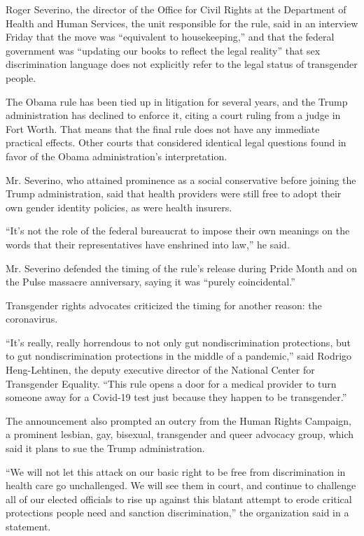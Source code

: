Roger Severino, the director of the Office for Civil Rights at the
Department of Health and Human Services, the unit responsible for the
rule, said in an interview Friday that the move was ``equivalent to
housekeeping,'' and that the federal government was ``updating our books
to reflect the legal reality'' that sex discrimination language does not
explicitly refer to the legal status of transgender people.

The Obama rule has been tied up in litigation for several years, and the
Trump administration has declined to enforce it, citing a court ruling
from a judge in Fort Worth. That means that the final rule does not have
any immediate practical effects. Other courts that considered identical
legal questions found in favor of the Obama administration's
interpretation.

Mr. Severino, who attained prominence as a social conservative before
joining the Trump administration, said that health providers were still
free to adopt their own gender identity policies, as were health
insurers.

``It's not the role of the federal bureaucrat to impose their own
meanings on the words that their representatives have enshrined into
law,'' he said.

Mr. Severino defended the timing of the rule's release during Pride
Month and on the Pulse massacre anniversary, saying it was ``purely
coincidental.''

Transgender rights advocates criticized the timing for another reason:
the coronavirus.

``It's really, really horrendous to not only gut nondiscrimination
protections, but to gut nondiscrimination protections in the middle of a
pandemic,'' said Rodrigo Heng-Lehtinen, the deputy executive director of
the National Center for Transgender Equality. ``This rule opens a door
for a medical provider to turn someone away for a Covid-19 test just
because they happen to be transgender.''

The announcement also prompted an outcry from the Human Rights Campaign,
a prominent lesbian, gay, bisexual, transgender and queer advocacy
group, which said it plans to sue the Trump administration.

``We will not let this attack on our basic right to be free from
discrimination in health care go unchallenged. We will see them in
court, and continue to challenge all of our elected officials to rise up
against this blatant attempt to erode critical protections people need
and sanction discrimination,'' the organization said in a statement.

